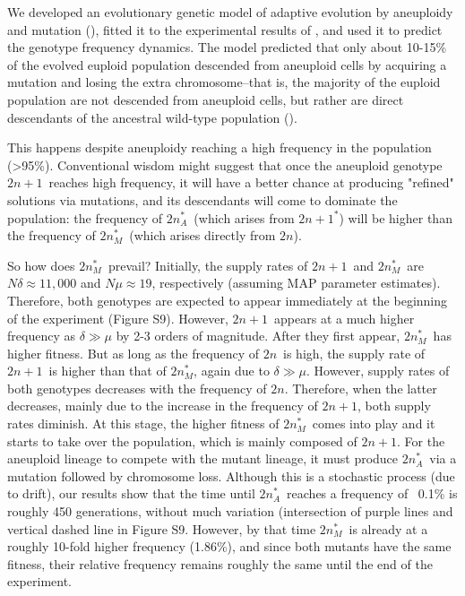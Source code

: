 \documentclass[12pt]{article}
\newcommand{\euwt}{\emph{$2n$}}
\newcommand{\anwt}{\emph{$2n+1$}}
\newcommand{\eumtM}{\emph{$2n^*_M$}}
\newcommand{\eumtA}{\emph{$2n^*_A$}}
\newcommand{\anmt}{\emph{$2n+1^*$}}
\begin{document}
We developed an evolutionary genetic model of adaptive evolution by aneuploidy and mutation (), fitted it to the experimental results of \citet{Yona2012}, and used it to predict the genotype frequency dynamics.
The model predicted that only about 10-15\% of the evolved euploid population descended from aneuploid cells by acquiring a mutation and losing the extra chromosome--that is, the majority of the euploid population are not descended from aneuploid cells, but rather are direct descendants of the ancestral wild-type population ().

This happens despite aneuploidy reaching a high frequency in the population (>95\%). 
Conventional wisdom might suggest that once the aneuploid genotype \anwt\ reaches high frequency, it will have a better chance at producing "refined" solutions via mutations, and its descendants will come to dominate the population: the frequency of \eumtA\ (which arises from \anmt) will be higher than the frequency of \eumtM\ (which arises directly from \euwt).

So how does \eumtM\ prevail?
Initially, the supply rates of \anwt\ and \eumtM\ are $N \delta \approx 11,000$ and $N \mu \approx 19$, respectively (assuming MAP parameter estimates). 
Therefore, both genotypes are expected to appear immediately at the beginning of the experiment (Figure S9).
However, \anwt\ appears at a much higher frequency as $\delta \gg \mu$ by 2-3 orders of magnitude.
After they first appear, \eumtM\ has higher fitness.
But as long as the frequency of \euwt\ is high, the supply rate of \anwt\ is higher than that of \eumtM, again due to $\delta \gg \mu$. 
However, supply rates of both genotypes decreases with the frequency of \euwt.
Therefore, when the latter decreases, mainly due to the increase in the frequency of \anwt, both supply rates diminish.
At this stage, the higher fitness of \eumtM\ comes into play and it starts to take over the population, which is mainly composed of \anwt.
For the aneuploid lineage to compete with the mutant lineage, it must produce \eumtA\ via a mutation followed by chromosome loss.
Although this is a stochastic process (due to drift), our results show that the time until \eumtA\ reaches a frequency of ~0.1\% is roughly 450 generations, without much variation (intersection of purple lines and vertical dashed line in Figure S9.
However, by that time \eumtM\ is already at a roughly 10-fold higher frequency (1.86\%), and since both mutants have the same fitness, their relative frequency remains roughly the same until the end of the experiment. 
\end{document}
